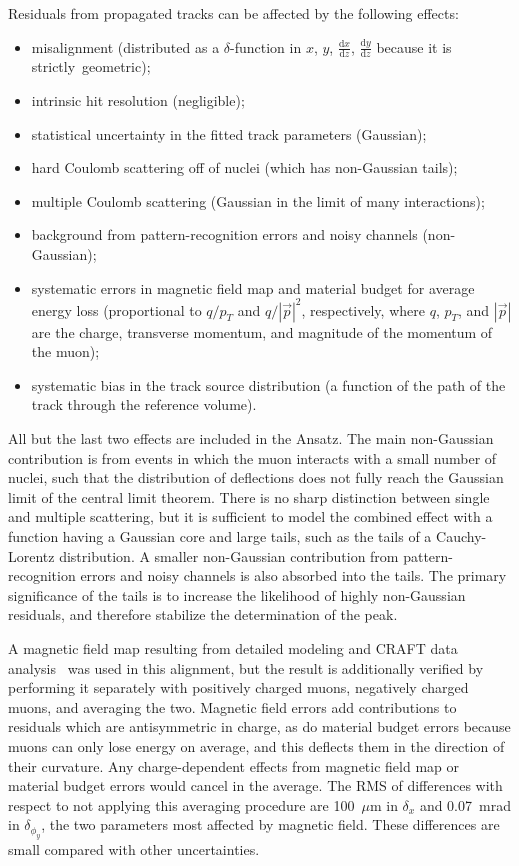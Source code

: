 \documentclass[11pt,twoside,a4paper,cmspaper]{cms-tdr}
\begin{document}
Residuals from propagated tracks can be affected by the following effects:
\begin{itemize}
\item misalignment (distributed as a $\delta$-function in $x$, $y$,
$\frac{\textrm{d}x}{\textrm{d}z}$, $\frac{\textrm{d}y}{\textrm{d}z}$ because it
is \mbox{strictly geometric);\hspace{-0.5 cm}}
\item intrinsic hit resolution (negligible);
\item statistical uncertainty in the fitted track parameters (Gaussian);
\item hard Coulomb scattering off of nuclei (which has non-Gaussian tails);
\item multiple Coulomb scattering (Gaussian in the limit of many interactions);
\item background from pattern-recognition errors and
noisy channels (non-Gaussian);
\item systematic errors in magnetic field map and material budget for
average energy loss (proportional to $q/p_T$ and $q/|\vec{p}|^2$,
respectively, where $q$, $p_T$, and $|\vec{p}|$ are the charge,
transverse momentum, and magnitude of the momentum of the muon);
\item systematic bias in the track source distribution (a function of
the path of the track through the reference volume).
\end{itemize}
All but the last two effects are included in the Ansatz.  The main
non-Gaussian contribution is from events in which the muon interacts
with a small number of nuclei, such that the distribution of
deflections does not fully reach the Gaussian limit of the central
limit theorem.  There is no sharp distinction between single and
multiple scattering, but it is sufficient to model the combined effect
with a function having a Gaussian core and large tails, such as the
tails of a Cauchy-Lorentz distribution.  A smaller non-Gaussian
contribution from pattern-recognition errors and noisy channels is
also absorbed into the tails.  The primary significance of the tails
is to increase the likelihood of highly non-Gaussian residuals, and
therefore stabilize the determination of the peak.

A magnetic field map resulting from detailed modeling and CRAFT data
analysis~\cite{ref:magnetic_field} was used in this alignment, but the
result is additionally verified by performing it separately with
positively charged muons, negatively charged muons, and averaging the
two.  Magnetic field errors add contributions to residuals which are
antisymmetric in charge, as do material budget errors because muons
can only lose energy on average, and this deflects them in the
direction of their curvature.  Any charge-dependent effects from
magnetic field map or material budget errors would cancel in the
average.  The RMS of differences with respect to not applying this
averaging procedure are 100~$\mu$m in $\delta_x$ and 0.07~mrad in
$\delta_{\phi_y}$, the two parameters most affected by magnetic field.
These differences are small compared with other uncertainties.
\end{document}
